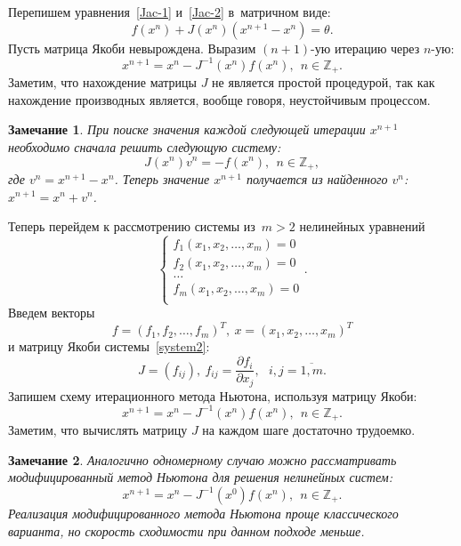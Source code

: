 \documentclass[11pt,a4paper,twoside]{report}
\numberwithin{equation}{section}
\theoremstyle{definition}
\theoremstyle{plain}
\newtheorem*{note*}{Замечание}
\begin{document}
%
Перепишем уравнения~\eqref{Jac-1} и~\eqref{Jac-2} в~матричном виде:
%
\begin{equation}
%
    \label{matr_system1}
    f(x^n) + J(x^n)(x^{n + 1} - x^n) = \theta.
%
\end{equation}
%
Пусть матрица Якоби невырождена. Выразим $(n+1)$-ую итерацию
через $n$-ую:
%
\begin{equation}
%
    \label{matr_system2}
    x^{n + 1} = x^n - J^{-1}(x^n)f(x^n), ~~n\in\mathbb{Z_+}.
%
\end{equation}
%
Заметим, что нахождение матрицы $J$ не является простой процедурой, так как
нахождение производных является, вообще говоря, неустойчивым процессом.
%
\begin{note*}
%
При поиске значения каждой следующей итерации $x^{n + 1}$ необходимо сначала
решить следующую систему:
%
$$
    J(x^n)v^n = -f(x^n), ~~n\in\mathbb{Z_+},
$$
%
где $v^n = x^{n + 1} - x^n$. Теперь значение $x^{n + 1}$ получается из
найденного $v^n$: $x^{n + 1} = x^n + v^n$.
%
\end{note*}
%
Теперь перейдем к рассмотрению системы из~$m>2$ нелинейных уравнений
%
\begin{equation}
    \label{system2}
    \begin{cases}
        f_1(x_1,x_2,\dots,x_m) = 0 \\
        f_2(x_1,x_2,\dots,x_m) = 0 \\
        \dots \\
        f_m(x_1,x_2,\dots,x_m) = 0 \\
    \end{cases}.
\end{equation}
%
Введем векторы
%
$$
    f = (f_1,f_2,\dots,f_m)^T , ~x = (x_1,x_2,\dots,x_m)^T
$$
%
и матрицу Якоби системы~\eqref{system2}:
%
$$
    J = (f_{ij}),~f_{ij} = \frac{\partial f_i}{\partial x_j},
    ~~~i,j = \overline{1,m}.
$$
%
Запишем схему итерационного метода Ньютона, используя матрицу Якоби:
%
$$
    x^{n + 1} = x^n - J^{-1}(x^n)f(x^n), ~~n\in\mathbb{Z_+}.
$$
%
Заметим, что вычислять матрицу $J$ на каждом шаге достаточно трудоемко.

%
\begin{note*}
%
Аналогично одномерному случаю можно рассматривать модифицированный метод
Ньютона для решения нелинейных систем:
%
$$
    x^{n + 1} = x^n - J^{-1}(x^0)f(x^n), ~~n\in\mathbb{Z_+}.
$$
%
Реализация модифицированного метода Ньютона проще классического варианта,
но скорость сходимости при данном подходе меньше.
%
\end{note*}
%
%
\end{document}
